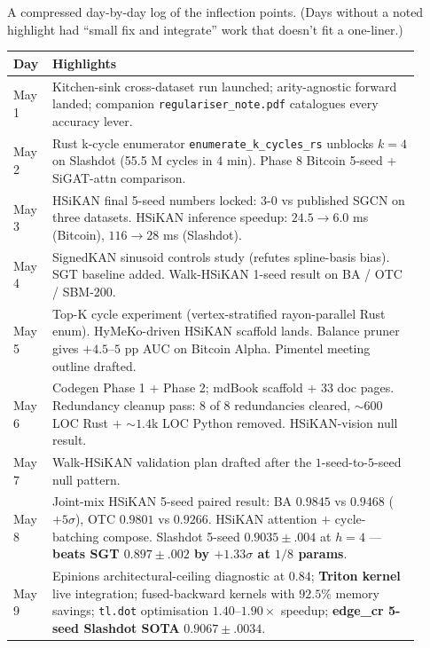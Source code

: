 \documentclass[11pt,a4paper]{article}
\theoremstyle{plain}
\theoremstyle{definition}
\newcommand{\code}[1]{\texttt{\small #1}}
\begin{document}
A compressed day-by-day log of the inflection points. (Days
without a noted highlight had ``small fix and integrate'' work
that doesn't fit a one-liner.)

\begin{center}\footnotesize
\begin{tabular}{p{0.06\linewidth} p{0.85\linewidth}}
\toprule
Day & Highlights \\
\midrule
May 1 & Kitchen-sink cross-dataset run launched; arity-agnostic
        forward landed; companion \code{regulariser\_note.pdf}
        catalogues every accuracy lever. \\
May 2 & Rust k-cycle enumerator \code{enumerate\_k\_cycles\_rs}
        unblocks $k{=}4$ on Slashdot (55.5 M cycles in 4 min).
        Phase 8 Bitcoin 5-seed + SiGAT-attn comparison. \\
May 3 & HSiKAN final 5-seed numbers locked: $3$-$0$ vs published
        SGCN on three datasets. HSiKAN inference speedup:
        $24.5 \to 6.0$ ms (Bitcoin), $116 \to 28$ ms (Slashdot). \\
May 4 & SignedKAN sinusoid controls study (refutes spline-basis bias).
        SGT baseline added. Walk-HSiKAN 1-seed result on BA / OTC / SBM-200. \\
May 5 & Top-K cycle experiment (vertex-stratified rayon-parallel
        Rust enum). HyMeKo-driven HSiKAN scaffold lands.
        Balance pruner gives $+4.5$–$5$ pp AUC on Bitcoin Alpha.
        Pimentel meeting outline drafted. \\
May 6 & Codegen Phase 1 + Phase 2; mdBook scaffold + 33 doc pages.
        Redundancy cleanup pass: 8 of 8 redundancies cleared,
        $\sim 600$ LOC Rust $+$ $\sim 1.4$k LOC Python removed.
        HSiKAN-vision null result. \\
May 7 & Walk-HSiKAN validation plan drafted after the
        $1$-seed-to-$5$-seed null pattern. \\
May 8 & Joint-mix HSiKAN 5-seed paired result: BA $0.9845$ vs
        $0.9468$ ($+5\sigma$), OTC $0.9801$ vs $0.9266$. HSiKAN
        attention $+$ cycle-batching compose. Slashdot 5-seed
        $0.9035 \pm .004$ at $h{=}4$ — \textbf{beats SGT
        $0.897 \pm .002$ by $+1.33\sigma$ at $1/8$ params}. \\
May 9 & Epinions architectural-ceiling diagnostic at $0.84$;
        \textbf{Triton kernel} live integration; fused-backward
        kernels with $92.5\%$ memory savings; \code{tl.dot}
        optimisation $1.40$–$1.90\times$ speedup; \textbf{edge\_cr
        5-seed Slashdot SOTA} $0.9067 \pm .0034$. \\

\end{tabular}
\end{center}
\end{document}
